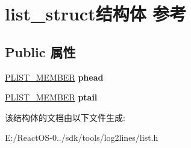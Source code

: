 \hypertarget{structlist__struct}{}\section{list\+\_\+struct结构体 参考}
\label{structlist__struct}
\subsection*{Public 属性}
\begin{DoxyCompactItemize}
\item 
\mbox{\label{structlist__struct_ab863b4b5370bbdba1759990a92304e0a}} 
\hyperlink{structentry__struct}{P\+L\+I\+S\+T\+\_\+\+M\+E\+M\+B\+ER} {\bfseries phead}
\item 
\mbox{\label{structlist__struct_aed67512efcbd8fc677b9a9f29e9e9424}} 
\hyperlink{structentry__struct}{P\+L\+I\+S\+T\+\_\+\+M\+E\+M\+B\+ER} {\bfseries ptail}
\end{DoxyCompactItemize}


该结构体的文档由以下文件生成\+:\begin{DoxyCompactItemize}
\item 
E\+:/\+React\+O\+S-\/0../sdk/tools/log2lines/list.\+h\end{DoxyCompactItemize}
